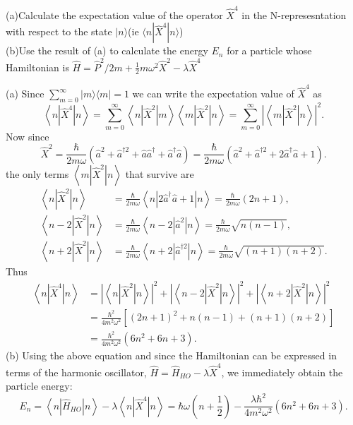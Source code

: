 \begin{exercise}
	(a)Calculate the expectation value of the operator $\hat{X}^4$ in the N-represesntation with respect to the state $|n\rangle$(ie $\langle n|\hat{X}^4 |n\rangle$)\\
	(b)Use the result of (a) to calculate the energy $E_n$ for a particle whose Hamiltonian is $\hat{H}=\hat{P}^2/2m+\frac{1}{2}m\omega^2\hat{X}^2-\lambda\hat{X}^4$
\end{exercise}
\begin{answer}
	(a) Since $\sum_{m=0}^{\infty}|m\rangle\langle m|=1$ we can write the expectation value of $\hat{X}^{4}$ as
	$$
	\left\langle n\left|\hat{X}^{4}\right| n\right\rangle=\sum_{m=0}^{\infty}\left\langle n\left|\hat{X}^{2}\right| m\right\rangle\left\langle m\left|\hat{X}^{2}\right| n\right\rangle=\sum_{m=0}^{\infty}\left|\left\langle m\left|\hat{X}^{2}\right| n\right\rangle\right|^{2} .
	$$
	Now since
	$$
	\hat{X}^{2}=\frac{\hbar}{2 m \omega}\left(\hat{a}^{2}+\hat{a}^{\dagger 2}+\hat{a} \hat{a}^{\dagger}+\hat{a}^{\dagger} \hat{a}\right)=\frac{\hbar}{2 m \omega}\left(\hat{a}^{2}+\hat{a}^{\dagger 2}+2 \hat{a}^{\dagger} \hat{a}+1\right) .
	$$
	the only terms $\left\langle m\left|\hat{X}^{2}\right| n\right\rangle$ that survive are
	$$
	\begin{aligned}
	\left\langle n\left|\hat{X}^{2}\right| n\right\rangle &=\frac{\hbar}{2 m \omega}\left\langle n\left|2 \hat{a}^{\dagger} \hat{a}+1\right| n\right\rangle=\frac{\hbar}{2 m \omega}(2 n+1), \\
	\left\langle n-2\left|\hat{X}^{2}\right| n\right\rangle &=\frac{\hbar}{2 m \omega}\left\langle n-2\left|\hat{a}^{2}\right| n\right\rangle=\frac{\hbar}{2 m \omega} \sqrt{n(n-1)}, \\
	\left\langle n+2\left|\hat{X}^{2}\right| n\right\rangle &=\frac{\hbar}{2 m \omega}\left\langle n+2\left|\hat{a}^{\dagger 2}\right| n\right\rangle=\frac{\hbar}{2 m \omega} \sqrt{(n+1)(n+2)} .
	\end{aligned}
	$$
	Thus
	$$
	\begin{aligned}
	\left\langle n\left|\hat{X}^{4}\right| n\right\rangle &=\left|\left\langle n\left|\hat{X}^{2}\right| n\right\rangle\right|^{2}+\left|\left\langle n-2\left|\hat{X}^{2}\right| n\right\rangle\right|^{2}+\left|\left\langle n+2\left|\hat{X}^{2}\right| n\right\rangle\right|^{2} \\
	&=\frac{\hbar^{2}}{4 m^{2} \omega^{2}}\left[(2 n+1)^{2}+n(n-1)+(n+1)(n+2)\right] \\
	&=\frac{\hbar^{2}}{4 m^{2} \omega^{2}}\left(6 n^{2}+6 n+3\right) .
	\end{aligned}
	$$
	(b) Using the above equation and since the Hamiltonian can be expressed in terms of the harmonic oscillator, $\hat{H}=\hat{H}_{H O}-\lambda \hat{X}^{4}$, we immediately obtain the particle energy:
	$$
	E_{n}=\left\langle n\left|\hat{H}_{H O}\right| n\right\rangle-\lambda\left\langle n\left|\hat{X}^{4}\right| n\right\rangle=\hbar \omega\left(n+\frac{1}{2}\right)-\frac{\lambda \hbar^{2}}{4 m^{2} \omega^{2}}\left(6 n^{2}+6 n+3\right) .
	$$
\end{answer}
